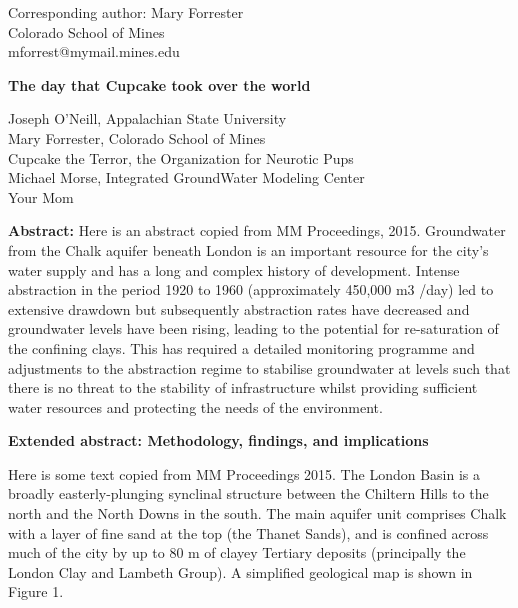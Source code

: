 \documentclass[12pt]{article}
\begin{document}
\begin{flushleft}
   \begin{footnotesize}
      Corresponding author:
      Mary Forrester\\
Colorado School of Mines\\
mforrest@mymail.mines.edu
   \end{footnotesize}
\end{flushleft}

\begin{center}
   \textbf{The day that Cupcake took over the world}
\end{center}

\begin{center}
   \begin{footnotesize}
      Joseph O'Neill, Appalachian State University\\
Mary Forrester, Colorado School of Mines\\
Cupcake the Terror, the Organization for Neurotic Pups\\
Michael Morse, Integrated GroundWater Modeling Center\\
Your Mom
   \end{footnotesize}
\end{center}

\begin{adjustwidth}{0.5in}{0.5in}
\begin{footnotesize}
   \setlength{\parindent}{0cm}
   \textbf{Abstract:} Here is an abstract copied from MM Proceedings, 2015. Groundwater from the Chalk aquifer beneath London is an important resource for the city's water supply
and has a long and complex history of development. Intense abstraction in the period 1920 to 1960
(approximately 450,000 m3
/day) led to extensive drawdown but subsequently abstraction rates have
decreased and groundwater levels have been rising, leading to the potential for re-saturation of the
confining clays. This has required a detailed monitoring programme and adjustments to the abstraction
regime to stabilise groundwater at levels such that there is no threat to the stability of infrastructure whilst
providing sufficient water resources and protecting the needs of the environment. 
\end{footnotesize}
\end{adjustwidth}
\vspace{3mm}

\begin{flushleft}
\textbf{Extended abstract: Methodology, findings, and implications}
\end{flushleft}
Here is some text copied from MM Proceedings 2015. The London Basin is a broadly easterly-plunging synclinal structure between the Chiltern Hills to the north and the North Downs in the south. The main aquifer unit comprises Chalk with a layer of fine sand at the top (the Thanet Sands), and is confined across much of the city by up to 80 m of clayey Tertiary deposits
(principally the London Clay and Lambeth Group). A simplified geological map is shown in Figure 1.
\end{document}

